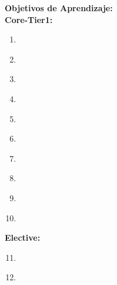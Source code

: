 \noindent \textbf{Objetivos de Aprendizaje:}\\
\noindent \textbf{Core-Tier1:}
\begin{enumerate}
	\setcounter{enumi}{0}
	\item \SPIntellectualPropertyLODiscussTheOf\xspace[\SPIntellectualPropertyLODiscussTheOfLevel]\label{sec:BOK:SPIntellectualPropertyLODiscussTheOf}
	\item \SPIntellectualPropertyLODiscussTheTheOf\xspace[\SPIntellectualPropertyLODiscussTheTheOfLevel]\label{sec:BOK:SPIntellectualPropertyLODiscussTheTheOf}
	\item \SPIntellectualPropertyLODescribeLegislation\xspace[\SPIntellectualPropertyLODescribeLegislationLevel]\label{sec:BOK:SPIntellectualPropertyLODescribeLegislation}
	\item \SPIntellectualPropertyLOCritiqueLegislation\xspace[\SPIntellectualPropertyLOCritiqueLegislationLevel]\label{sec:BOK:SPIntellectualPropertyLOCritiqueLegislation}
	\item \SPIntellectualPropertyLOIdentifyContemporary\xspace[\SPIntellectualPropertyLOIdentifyContemporaryLevel]\label{sec:BOK:SPIntellectualPropertyLOIdentifyContemporary}
	\item \SPIntellectualPropertyLOJustify\xspace[\SPIntellectualPropertyLOJustifyLevel]\label{sec:BOK:SPIntellectualPropertyLOJustify}
	\item \SPIntellectualPropertyLOEvaluateTheInherent\xspace[\SPIntellectualPropertyLOEvaluateTheInherentLevel]\label{sec:BOK:SPIntellectualPropertyLOEvaluateTheInherent}
	\item \SPIntellectualPropertyLOInterpretTheImplementation\xspace[\SPIntellectualPropertyLOInterpretTheImplementationLevel]\label{sec:BOK:SPIntellectualPropertyLOInterpretTheImplementation}
	\item \SPIntellectualPropertyLODiscussTheInPatents\xspace[\SPIntellectualPropertyLODiscussTheInPatentsLevel]\label{sec:BOK:SPIntellectualPropertyLODiscussTheInPatents}
	\item \SPIntellectualPropertyLOCharacterizeAndConcepts\xspace[\SPIntellectualPropertyLOCharacterizeAndConceptsLevel]\label{sec:BOK:SPIntellectualPropertyLOCharacterizeAndConcepts}
\end{enumerate}
\noindent \textbf{Elective:}
\begin{enumerate}
	\setcounter{enumi}{10}
	\item \SPIntellectualPropertyLOIdentifyTheTheMovement\xspace[\SPIntellectualPropertyLOIdentifyTheTheMovementLevel]\label{sec:BOK:SPIntellectualPropertyLOIdentifyTheTheMovement}
	\item \SPIntellectualPropertyLOIdentifyTheOf\xspace[\SPIntellectualPropertyLOIdentifyTheOfLevel]\label{sec:BOK:SPIntellectualPropertyLOIdentifyTheOf}
\end{enumerate}



